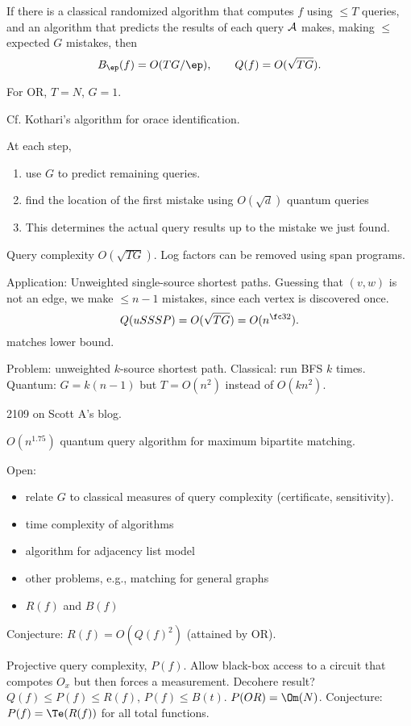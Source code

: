 If there is a classical randomized algorithm that computes $f$ using $\le T$ queries, and an algorithm that predicts the results of each query $\cal A$ makes, making $\le$ expected $G$ mistakes, then 
\[
B_\ep(f)=O(TG/\ep), \qquad Q(f)=O(\sqrt{TG}).
\]

For OR, $T=N$, $G=1$.

Cf. Kothari's algorithm for orace identification.

At each step, 
\begin{enumerate}
\item
use $G$ to predict remaining queries.
\item 
find the location of the first mistake using $O(\sqrt d)$ quantum queries
\item
This determines the actual query results up to the mistake we just found.
\end{enumerate}
Query complexity $O(\sqrt{TG})$. Log factors can be removed using span programs.

Application: Unweighted single-source shortest paths.
Guessing that $(v,w)$ is not an edge, we make $\le n-1$ mistakes, since each vertex is discovered once.
\[
Q(uSSSP)=O(\sqrt{TG})=O(n^{\fc 32}).
\]
matches lower bound.

Problem: unweighted $k$-source shortest path. 
Classical: run BFS $k$ times. 
Quantum: $G=k(n-1)$ but $T=O(n^2)$ instead of $O(kn^2)$.

2109 on Scott A's blog.

$O(n^{1.75})$ quantum query algorithm for maximum bipartite matching.

Open:
\begin{itemize}
\item
relate $G$ to classical measures of query complexity (certificate, sensitivity).
\item 
time complexity of algorithms
\item
algorithm for adjacency list model
\item
other problems, e.g., matching for general graphs
\item $R(f)$ and $B(f)$
\end{itemize}


Conjecture: $R(f)=O(Q(f)^2)$ (attained by OR).

Projective query complexity, $P(f)$. Allow black-box access to a circuit that compotes $O_x$ but then forces a measurement.
Decohere result? $Q(f)\le P(f)\le R(f)$, $P(f)\le B(t)$. $P(OR)=\Om(N)$.
Conjecture: $P(f)=\Te(R(f))$ for all total functions.